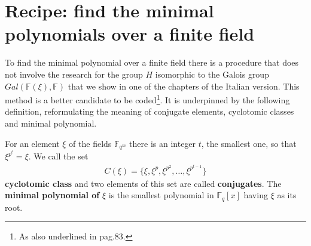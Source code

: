 \section{Recipe: find the minimal polynomials over a finite field}
To find the minimal polynomial over a finite field there is a procedure that does not involve the research for the group $H$ isomorphic to the Galois group $Gal(\mathbb{F}(\xi), \mathbb{F})$ that we show in one of the chapters of the Italian version. This method is a better candidate to be coded\footnote{As also underlined in \cite{cattaneo} pag.83.}.
It is underpinned by the following definition, reformulating the meaning of conjugate elements, cyclotomic classes and minimal polynomial.
\begin{definition}
   For an element $\xi$ of the fields $\mathbb{F}_{q^m}$ there is an integer $t$, the smallest one, so that $\xi^{p^{t}} = \xi$. We call the set
   \begin{align*}
      C(\xi) = \lbrace \xi, \xi^{p}, \xi^{p^{2}}, \dots ,\xi^{p^{t-1}} \rbrace
   \end{align*}
   {\bf cyclotomic class} and two elements of this set are called {\bf conjugates}.
   The {\bf minimal polynomial of} $\xi$ is the smallest polynomial in $\mathbb{F}_{q}[x]$ having $\xi$ as its root.
\end{definition}

